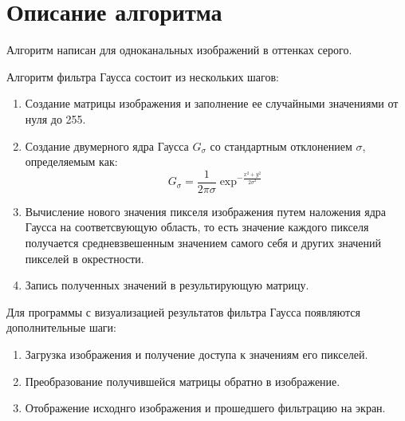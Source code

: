 \documentclass{report}
\begin{document}
\section*{Описание алгоритма}
\par Алгоритм написан для одноканальных изображений в оттенках серого.
\par Алгоритм фильтра Гаусса состоит из нескольких шагов:
\begin{enumerate}
  \item Создание матрицы изображения и заполнение ее случайными значениями от нуля до 255.
  \item Создание двумерного ядра Гаусса $G_{\sigma}$ со стандартным отклонением $\sigma$, определяемым как:
  $$ G_{\sigma}=\frac{1}{2\pi\sigma}\exp^{-\frac{x^2+y^2}{2\sigma^2}} $$
  \item Вычисление нового значения пикселя изображения путем наложения ядра Гаусса на соответсвующую область, то есть значение каждого пикселя получается средневзвешенным значением самого себя и других значений пикселей в окрестности.
  \item Запись полученных значений в результирующую матрицу.
\end{enumerate}
\par Для программы с визуализацией результатов фильтра Гаусса появляются дополнительные шаги:
\begin{enumerate}
    \item Загрузка изображения и получение доступа к значениям его пикселей.
    \item Преобразование получившейся матрицы обратно в изображение.
    \item Отображение исходнго изображения и прошедшего фильтрацию на экран.
\end{enumerate}
\newpage

\end{document}
